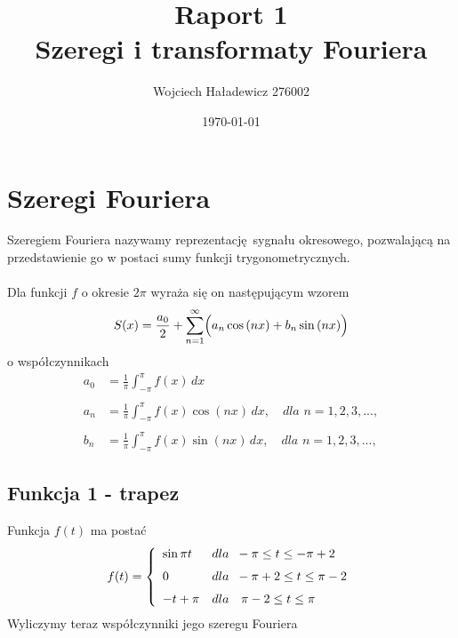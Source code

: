 \documentclass[leqno,a4paper]{article}
\author{\LARGE Wojciech Haładewicz 276002}
\title{\Huge Raport 1 \\
Szeregi i transformaty Fouriera}
\date{\today}
\begin{document}
\maketitle

\newpage

\tableofcontents

\newpage

{}
\section*{Szeregi Fouriera}

Szeregiem Fouriera nazywamy reprezentację sygnału okresowego, pozwalającą na przedstawienie go w postaci sumy funkcji trygonometrycznych.
\\ \\
Dla funkcji $f$ o okresie $2\pi$ wyraża się on następującym wzorem
\begin{equation*}
S(x) = \frac{a_0}{2} + \sum\limits_{n=1}^\infty \Bigl(a_n\cos{(nx)}+ b_n\sin{(nx)}\Bigr)
\end{equation*}
o współczynnikach
\begin{align*}
a_0 &= \frac{1}{\pi}\int_{-\pi}^{\pi} f(x)\,dx
\\\\
a_n &= \frac{1}{\pi}\int_{-\pi}^{\pi} f(x)\cos{(nx)}\,dx,\quad \textit{dla n} = 1,2,3,...,
\\\\
b_n &= \frac{1}{\pi}\int_{-\pi}^{\pi} f(x)\sin{(nx)}\,dx,\quad \textit{dla n} = 1,2,3,...,
\end{align*}

{}
\subsection*{Funkcja 1 - trapez}

Funkcja $f(t)$ ma postać
\[  f(t)= \left\{
\begin{array}{ll}
      \sin{\pi t} &dla\hspace{0.2cm}-\pi \leq t\leq -\pi+2 \\[1.5ex]
      0 &dla\hspace{0.2cm}-\pi+2\leq t\leq \pi-2 \\[1.5ex]
      -t+\pi &dla\hspace{0.34cm}\pi-2\leq t\leq \pi
\end{array}  
\right. \]
Wyliczymy teraz współczynniki jego szeregu Fouriera 
\newline
\end{document}

